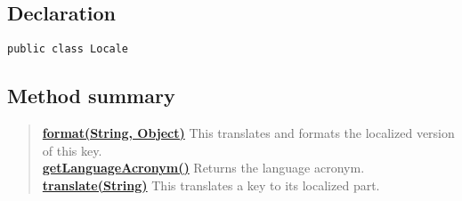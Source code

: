 \documentclass[11pt,a4paper]{report}
\begin{document}
{{{{{{{{{{{{{{			\subsection{Declaration}{
				\begin{lstlisting}[frame=none]
public class Locale
				\end{lstlisting}
			}
			
			\subsection{Method summary}{
				\begin{verse}
					\hyperlink{studyplanning.view.Locale.format(java.lang.String, java.lang.Object[])}{{\bf format(String, Object\lbrack \rbrack )}} This translates and formats the localized version of this key.\\
					\hyperlink{studyplanning.view.Locale.getLanguageAcronym()}{{\bf getLanguageAcronym()}} Returns the language acronym.\\
					\hyperlink{studyplanning.view.Locale.translate(java.lang.String)}{{\bf translate(String)}} This translates a key to its localized part.\\
				\end{verse}
			}
			
}}}}}}}}}}}}}}
\end{document}
